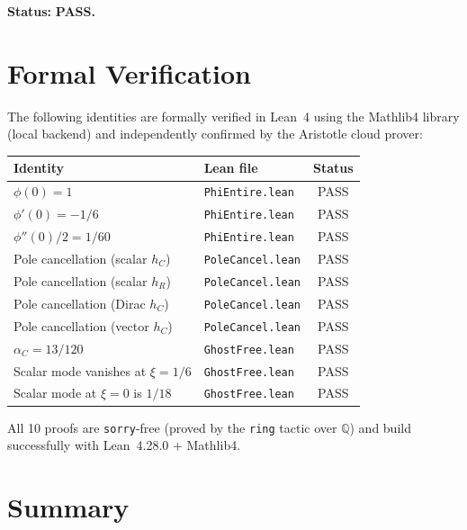 \documentclass[11pt,a4paper]{article}
\theoremstyle{plain}
\theoremstyle{definition}
\begin{document}
\noindent\textbf{Status:} \textcolor{green!50!black}{\textbf{PASS.}}

\section{Formal Verification}\label{sec:lean}

The following identities are formally verified in Lean~4
using the Mathlib4 library (local backend) and independently
confirmed by the Aristotle cloud prover:

\begin{center}
\begin{tabular}{llc}
\toprule
Identity & Lean file & Status \\
\midrule
$\phi(0) = 1$ & \texttt{PhiEntire.lean} & PASS \\
$\phi'(0) = -1/6$ & \texttt{PhiEntire.lean} & PASS \\
$\phi''(0)/2 = 1/60$ & \texttt{PhiEntire.lean} & PASS \\
Pole cancellation (scalar $h_C$) & \texttt{PoleCancel.lean} & PASS \\
Pole cancellation (scalar $h_R$) & \texttt{PoleCancel.lean} & PASS \\
Pole cancellation (Dirac $h_C$) & \texttt{PoleCancel.lean} & PASS \\
Pole cancellation (vector $h_C$) & \texttt{PoleCancel.lean} & PASS \\
$\alpha_C = 13/120$ & \texttt{GhostFree.lean} & PASS \\
Scalar mode vanishes at $\xi=1/6$ & \texttt{GhostFree.lean} & PASS \\
Scalar mode at $\xi=0$ is $1/18$ & \texttt{GhostFree.lean} & PASS \\
\bottomrule
\end{tabular}
\end{center}

All 10 proofs are \texttt{sorry}-free (proved by the \texttt{ring} tactic
over $\mathbb{Q}$) and build successfully with Lean~4.28.0 + Mathlib4.

\section{Summary}\label{sec:summary}
\end{document}
